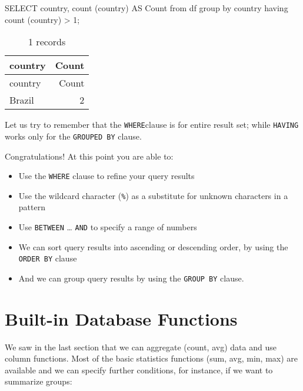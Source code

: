 \documentclass[
  letterpaper,
  DIV=11,
  numbers=noendperiod]{scrreprt}
\newenvironment{Shaded}{\begin{snugshade}}{\end{snugshade}}
\newcommand{\DecValTok}[1]{\textcolor[rgb]{0.68,0.00,0.00}{#1}}
\newcommand{\FunctionTok}[1]{\textcolor[rgb]{0.28,0.35,0.67}{#1}}
\newcommand{\KeywordTok}[1]{\textcolor[rgb]{0.00,0.23,0.31}{#1}}
\newcommand{\NormalTok}[1]{\textcolor[rgb]{0.00,0.23,0.31}{#1}}
\newcommand{\OperatorTok}[1]{\textcolor[rgb]{0.37,0.37,0.37}{#1}}
\providecommand{\tightlist}{%
  \setlength{\itemsep}{0pt}\setlength{\parskip}{0pt}}\usepackage{longtable,booktabs,array}
\begin{document}
\begin{Shaded}
\begin{Highlighting}[]
\KeywordTok{SELECT}\NormalTok{ country, }\FunctionTok{count}\NormalTok{ (country) }\KeywordTok{AS} \FunctionTok{Count} \KeywordTok{from}\NormalTok{ df }\KeywordTok{group} \KeywordTok{by}\NormalTok{ country }\KeywordTok{having} \FunctionTok{count}\NormalTok{ (country) }\OperatorTok{\textgreater{}} \DecValTok{1}\NormalTok{;}
\end{Highlighting}
\end{Shaded}

\begin{longtable}[]{@{}lr@{}}
\caption{1 records}\tabularnewline
\toprule()
country & Count \\
\midrule()
\endfirsthead
\toprule()
country & Count \\
\midrule()
\endhead
Brazil & 2 \\
\bottomrule()
\end{longtable}

Let us try to remember that the \texttt{WHERE}clause is for entire
result set; while \texttt{HAVING} works only for the
\texttt{GROUPED\ BY} clause.

Congratulations! At this point you are able to:

\begin{itemize}
\tightlist
\item
  Use the \texttt{WHERE} clause to refine your query results
\item
  Use the wildcard character (\texttt{\%}) as a substitute for unknown
  characters in a pattern
\item
  Use \texttt{BETWEEN} \ldots{} \texttt{AND} to specify a range of
  numbers
\item
  We can sort query results into ascending or descending order, by using
  the \texttt{ORDER\ BY} clause
\item
  And we can group query results by using the \texttt{GROUP\ BY} clause.
\end{itemize}

\hypertarget{built-in-database-functions}{%
\section{Built-in Database
Functions}\label{built-in-database-functions}}

We saw in the last section that we can aggregate (count, avg) data and
use column functions. Most of the basic statistics functions (sum, avg,
min, max) are available and we can specify further conditions, for
instance, if we want to summarize groups:
\end{document}
